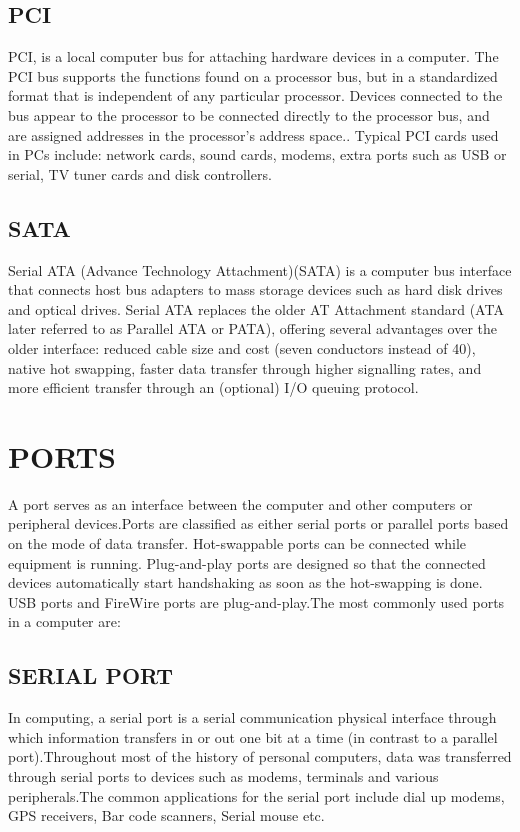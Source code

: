 \documentclass{article}
\begin{document}
 \subsection{PCI}
  PCI, is a local computer bus for attaching hardware devices in a computer. The PCI bus supports the
  functions found on a processor bus, but in a standardized format that is independent of any particular
  processor. Devices connected to the bus appear to the processor to be connected directly to the processor
  bus, and are assigned addresses in the processor's address space.. Typical PCI cards used in PCs include: network cards, sound
  cards, modems, extra ports such as USB or serial, TV tuner cards and disk controllers.
  \subsection{SATA}
   Serial ATA (Advance Technology Attachment)(SATA) is a computer bus interface that
   connects host bus adapters to mass storage devices such as hard disk drives and optical drives. Serial ATA
   replaces the older AT Attachment standard (ATA later referred to as Parallel ATA or PATA), offering
   several advantages over the older interface: reduced cable size and cost (seven conductors instead of 40),
   native hot swapping, faster data transfer through higher signalling rates, and more efficient transfer through
   an (optional) I/O queuing protocol.
   \section{PORTS}
   A port serves as an interface between the computer and other computers or peripheral devices.Ports are classified as either serial ports or parallel ports
   based on the mode of data transfer. Hot-swappable ports can be connected while equipment is running. Plug-and-play ports are designed so that the connected
   devices automatically start handshaking as soon as the hot-swapping is done. USB ports and FireWire ports are
   plug-and-play.The most commonly used ports in a computer are:
   \subsection{SERIAL PORT}
    In computing, a serial port is a serial communication physical interface through which
    information transfers in or out one bit at a time (in contrast to a parallel port).Throughout most of the
    history of personal computers, data was transferred through serial ports to devices such as modems,
    terminals and various peripherals.The common applications for the serial port include
    dial up modems, GPS receivers, Bar code scanners, Serial mouse etc.
\end{document}
